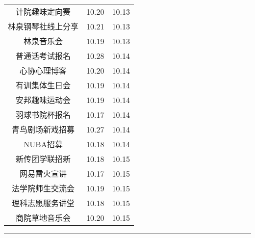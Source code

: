 \documentclass[letterpaper, 12pt]{article}
\begin{document}
\begin{multicols}{2}
{\begin{longtable}{|c|c|c|}
    计院趣味定向赛 & 10.20 & 10.13\\
    林泉钢琴社线上分享 & 10.21 & 10.13\\
    林泉音乐会 & 10.19 & 10.13\\
    普通话考试报名 & 10.28 & 10.14\\
    心协心理博客 & 10.20 & 10.14\\
    有训集体生日会 & 10.19 & 10.14\\
    安邦趣味运动会 & 10.19 & 10.14\\
    羽球书院杯报名 & 10.17 & 10.14\\
    青鸟剧场新戏招募 & 10.27 & 10.14\\
    NUBA招募 & 10.18 & 10.14\\
    新传团学联招新 & 10.18 & 10.15\\
    网易雷火宣讲 & 10.17 & 10.15\\
    法学院师生交流会 & 10.19 & 10.15\\
    理科志愿服务讲堂 & 10.18 & 10.15\\
    商院草地音乐会 & 10.20 & 10.15\\
    \hline
\end{longtable}
\unskip
\unpenalty
\unpenalty}\unvbox\colbbox
\end{multicols}
\hrule
\pagebreak
\end{document}
